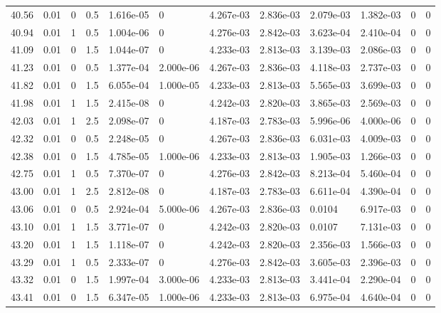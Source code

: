 \documentclass[preview]{standalone}
\begin{document}
{{{{{{\begin{tabular}{L{1.2cm}C{1.2cm} C{0.3cm}C{0.5cm} C{1.4cm}C{1.4cm} C{1.4cm}C{1.4cm} C{1.6cm}C{1.6cm} C{1.6cm}C{1.6cm}}
  40.56  &  0.01  & 0     & 0.5 &  1.616e-05  & 0  &  4.267e-03&   2.836e-03& 2.079e-03 & 1.382e-03   &  0 & 0  \\ 
  40.94  &  0.01  & 1     & 0.5 &  1.004e-06  & 0  &  4.276e-03&   2.842e-03& 3.623e-04 & 2.410e-04   &  0 & 0  \\ 
  41.09  &  0.01  & 0     & 1.5 &  1.044e-07  & 0  &  4.233e-03&   2.813e-03& 3.139e-03 & 2.086e-03   &  0 & 0  \\ 
  41.23  &  0.01  & 0     & 0.5 &  1.377e-04  & 2.000e-06  &  4.267e-03&   2.836e-03& 4.118e-03 & 2.737e-03   &  0 & 0  \\ 
  41.82  &  0.01  & 0     & 1.5 &  6.055e-04  & 1.000e-05  &  4.233e-03&   2.813e-03& 5.565e-03 & 3.699e-03   &  0 & 0  \\ 
  41.98  &  0.01  & 1     & 1.5 &  2.415e-08  & 0  &  4.242e-03&   2.820e-03& 3.865e-03 & 2.569e-03   &  0 & 0  \\ 
  42.03  &  0.01  & 1     & 2.5 &  2.098e-07  & 0  &  4.187e-03&   2.783e-03& 5.996e-06 & 4.000e-06   &  0 & 0  \\ 
  42.32  &  0.01  & 0     & 0.5 &  2.248e-05  & 0  &  4.267e-03&   2.836e-03& 6.031e-03 & 4.009e-03   &  0 & 0  \\ 
  42.38  &  0.01  & 0     & 1.5 &  4.785e-05  & 1.000e-06  &  4.233e-03&   2.813e-03& 1.905e-03 & 1.266e-03   &  0 & 0  \\ 
  42.75  &  0.01  & 1     & 0.5 &  7.370e-07  & 0  &  4.276e-03&   2.842e-03& 8.213e-04 & 5.460e-04   &  0 & 0  \\ 
  43.00  &  0.01  & 1     & 2.5 &  2.812e-08  & 0  &  4.187e-03&   2.783e-03& 6.611e-04 & 4.390e-04   &  0 & 0  \\ 
  43.06  &  0.01  & 0     & 0.5 &  2.924e-04  & 5.000e-06  &  4.267e-03&   2.836e-03& 0.0104 & 6.917e-03   &  0 & 0  \\ 
  43.10  &  0.01  & 1     & 1.5 &  3.771e-07  & 0  &  4.242e-03&   2.820e-03& 0.0107 & 7.131e-03   &  0 & 0  \\ 
  43.20  &  0.01  & 1     & 1.5 &  1.118e-07  & 0  &  4.242e-03&   2.820e-03& 2.356e-03 & 1.566e-03   &  0 & 0  \\ 
  43.29  &  0.01  & 1     & 0.5 &  2.333e-07  & 0  &  4.276e-03&   2.842e-03& 3.605e-03 & 2.396e-03   &  0 & 0  \\ 
  43.32  &  0.01  & 0     & 1.5 &  1.997e-04  & 3.000e-06  &  4.233e-03&   2.813e-03& 3.441e-04 & 2.290e-04   &  0 & 0  \\ 
  43.41  &  0.01  & 0     & 1.5 &  6.347e-05  & 1.000e-06  &  4.233e-03&   2.813e-03& 6.975e-04 & 4.640e-04   &  0 & 0  \\ 

\end{tabular}}}}}}}
\end{document}
